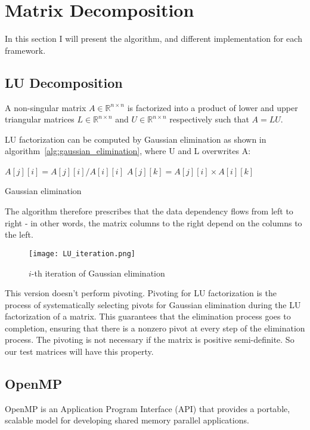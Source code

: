 \chapter{Matrix Decomposition}
\label{matrix_decomposition}
In this section I will present the algorithm, and different implementation for each framework.
\section{LU Decomposition}
A non-singular matrix $A \in \mathbb{R}^{n \times n}$ is factorized into a product of lower and upper triangular matrices $L \in \mathbb{R}^{n \times n}$ and $U \in \mathbb{R}^{n \times n}$ respectively such that $A = LU$.

LU factorization can be computed by Gaussian elimination as
shown in algorithm~\ref{alg:gaussian_elimination}, where U and L overwrites A:

\begin{algorithm}
\begin{algorithmic}
		\State $A[j][i] = A[j][i] / A[i][i]$ 
	\EndFor
			\State $A[j][k] = A[j][i] \times A[i][k]$ 
		\EndFor	
	\EndFor
\EndFor
\end{algorithmic}
\caption{Gaussian elimination}
\label{alg:gaussian_elimination}
\end{algorithm}

The algorithm therefore prescribes that the data dependency flows from left to right - in other words, the matrix columns to the right depend on the columns to the left. 

\begin{figure}[H]
\centering
\texttt{[image: LU\_iteration.png]}
\caption{$i$-th iteration of Gaussian elimination}
\end{figure}


This version doesn't perform pivoting. Pivoting for LU factorization is the process of systematically selecting pivots for Gaussian elimination
during the LU factorization of a matrix. This guarantees that the elimination process goes to completion, ensuring that there is a nonzero pivot at every step of the elimination process. The pivoting is not necessary if the matrix is positive semi-definite. So our test matrices will have this property.


\section{OpenMP}
OpenMP is an Application Program Interface (API) that provides a portable, scalable model for developing shared memory parallel applications.

